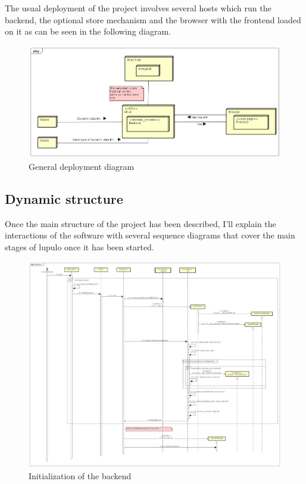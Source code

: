 \documentclass[12pt]{article}
\begin{document}
            The usual deployment of the project involves several hosts which run
            the backend, the optional store mechanism and the browser with the
            frontend loaded on it as can be seen in the following diagram.

            \begin{figure}[H]
                \centering
                \includegraphics[width=\textwidth]{deployment}
                \caption{General deployment diagram}
            \end{figure}

        \subsection{Dynamic structure}
            Once the main structure of the project has been described, I'll
            explain the interactions of the software with several sequence
            diagrams that cover the main stages of lupulo once it has been
            started.

            \thispagestyle{empty}
            \begin{landscape}
                \begin{figure}[h]
                    \centering
                    \includegraphics[height=1.1\textheight]{initialization}
                    \caption{Initialization of the backend}
                \end{figure}
            \end{landscape}
            \restoregeometry
\end{document}
